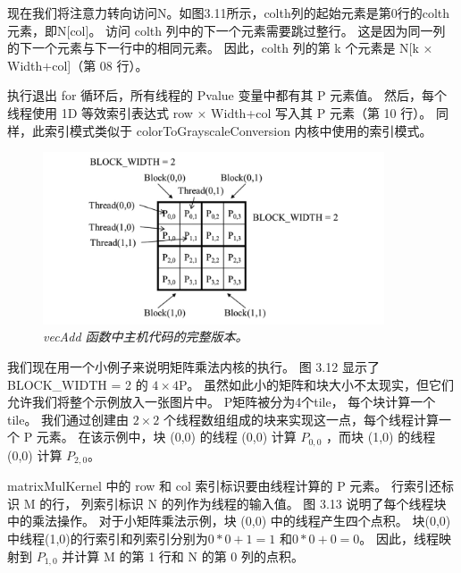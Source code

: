 现在我们将注意力转向访问N。如图3.11所示，colth列的起始元素是第0行的colth元素，即N[col]。 
访问 colth 列中的下一个元素需要跳过整行。 这是因为同一列的下一个元素与下一行中的相同元素。 
因此，colth 列的第 k 个元素是 N[k × Width+col]（第 08 行）。

执行退出 for 循环后，所有线程的 Pvalue 变量中都有其 P 元素值。 
然后，每个线程使用 1D 等效索引表达式 row × Width+col 写入其 P 元素（第 10 行）。 
同样，此索引模式类似于 colorToGrayscaleConversion 内核中使用的索引模式。

\begin{figure}[H]
	\centering
	\includegraphics[width=0.9\textwidth]{figs/F3.12.png}
	\caption{\textit{\color{red} vecAdd 函数中主机代码的完整版本。}}
\end{figure}

我们现在用一个小例子来说明矩阵乘法内核的执行。 图 3.12 显示了 BLOCK\_WIDTH = 2 的 $4\times 4$P。
虽然如此小的矩阵和块大小不太现实，但它们允许我们将整个示例放入一张图片中。 P矩阵被分为4个tile，
每个块计算一个tile。 我们通过创建由 $2\times 2$ 个线程数组组成的块来实现这一点，每个线程计算一个 P 元素。 
在该示例中，块 (0,0) 的线程 (0,0) 计算 $P_{0,0}$ ，而块 (1,0) 的线程 (0,0) 计算 $P_{2,0}$。

matrixMulKernel 中的 row 和 col 索引标识要由线程计算的 P 元素。 行索引还标识 M 的行，
列索引标识 N 的列作为线程的输入值。 图 3.13 说明了每个线程块中的乘法操作。 
对于小矩阵乘法示例，块 (0,0) 中的线程产生四个点积。 块(0,0)中线程(1,0)的行索引和列索引分别为$0*0 + 1 = 1$
和$0 * 0 + 0 = 0$。 因此，线程映射到 $P_{1,0}$ 并计算 M 的第 1 行和 N 的第 0 列的点积。

